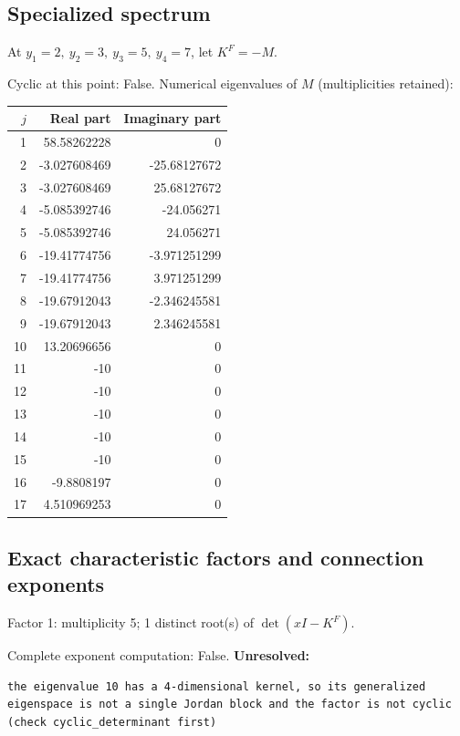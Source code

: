 \documentclass[10pt,a4paper]{article}
\newcommand{\fitmath}[1]{\sbox{\mathbox}{$\displaystyle #1$}\ifdim\wd\mathbox>\linewidth\resizebox{\linewidth}{!}{\usebox{\mathbox}}\else\usebox{\mathbox}\fi}
\begin{document}
\subsection*{Specialized spectrum}
At $y_1=2,\ y_2=3,\ y_3=5,\ y_4=7$, let $K^F=-M$.
\begin{center}\fitmath{\Delta=0}\end{center}
Cyclic at this point: False.
Numerical eigenvalues of $M$ (multiplicities retained):
\begin{center}\small\begin{tabular}{rrr}\toprule $j$ & Real part & Imaginary part\\\midrule
1 & 58.58262228 & 0\\
2 & -3.027608469 & -25.68127672\\
3 & -3.027608469 & 25.68127672\\
4 & -5.085392746 & -24.056271\\
5 & -5.085392746 & 24.056271\\
6 & -19.41774756 & -3.971251299\\
7 & -19.41774756 & 3.971251299\\
8 & -19.67912043 & -2.346245581\\
9 & -19.67912043 & 2.346245581\\
10 & 13.20696656 & 0\\
11 & -10 & 0\\
12 & -10 & 0\\
13 & -10 & 0\\
14 & -10 & 0\\
15 & -10 & 0\\
16 & -9.8808197 & 0\\
17 & 4.510969253 & 0\\
\bottomrule\end{tabular}\end{center}
\subsection*{Exact characteristic factors and connection exponents}
Factor 1: multiplicity 5; 1 distinct root(s) of $\det(xI-K^F)$.
\begin{center}\fitmath{\begin{aligned}p_{1}(x)&=x - 10\end{aligned}}\end{center}
Complete exponent computation: False.
\textbf{Unresolved:}

\begin{lstlisting}
the eigenvalue 10 has a 4-dimensional kernel, so its generalized eigenspace is not a single Jordan block and the factor is not cyclic (check cyclic_determinant first)
\end{lstlisting}
\end{document}

